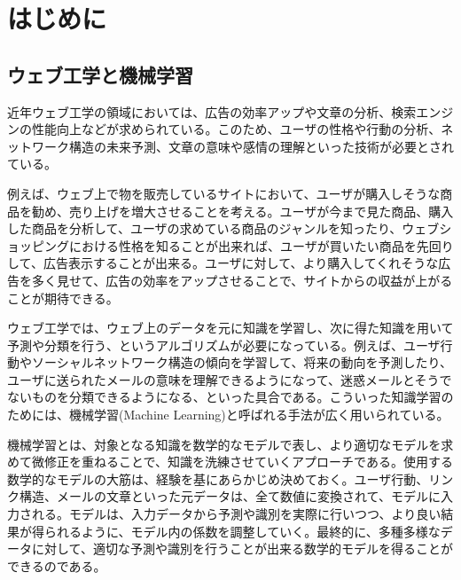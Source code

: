 \chapter{はじめに}
\label{chap:preface}
\section{ウェブ工学と機械学習}
近年ウェブ工学の領域においては、広告の効率アップや文章の分析、検索エンジンの性能向上などが求められている。このため、ユーザの性格や行動の分析、ネットワーク構造の未来予測、文章の意味や感情の理解といった技術が必要とされている。\par
例えば、ウェブ上で物を販売しているサイトにおいて、ユーザが購入しそうな商品を勧め、売り上げを増大させることを考える。ユーザが今まで見た商品、購入した商品を分析して、ユーザの求めている商品のジャンルを知ったり、ウェブショッピングにおける性格を知ることが出来れば、ユーザが買いたい商品を先回りして、広告表示することが出来る。ユーザに対して、より購入してくれそうな広告を多く見せて、広告の効率をアップさせることで、サイトからの収益が上がることが期待できる。\par
ウェブ工学では、ウェブ上のデータを元に知識を学習し、次に得た知識を用いて予測や分類を行う、というアルゴリズムが必要になっている。例えば、ユーザ行動やソーシャルネットワーク構造の傾向を学習して、将来の動向を予測したり、ユーザに送られたメールの意味を理解できるようになって、迷惑メールとそうでないものを分類できるようになる、といった具合である。こういった知識学習のためには、機械学習(Machine Learning)と呼ばれる手法が広く用いられている。\par
機械学習とは、対象となる知識を数学的なモデルで表し、より適切なモデルを求めて微修正を重ねることで、知識を洗練させていくアプローチである。使用する数学的なモデルの大筋は、経験を基にあらかじめ決めておく。ユーザ行動、リンク構造、メールの文章といった元データは、全て数値に変換されて、モデルに入力される。モデルは、入力データから予測や識別を実際に行いつつ、より良い結果が得られるように、モデル内の係数を調整していく。最終的に、多種多様なデータに対して、適切な予測や識別を行うことが出来る数学的モデルを得ることができるのである。

